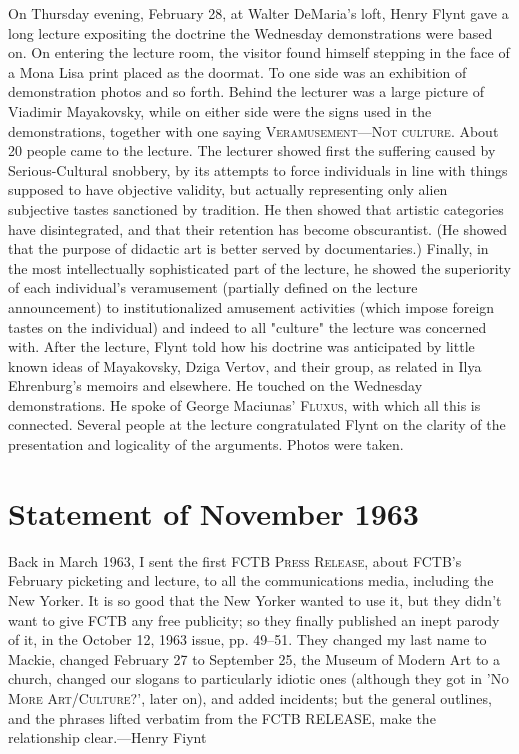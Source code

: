 \documentclass[10pt,twoside]{memoir}
\begin{document}
\begin{enumerate}
{\begin{enumerate}
On Thursday evening, February 28, at Walter DeMaria's loft, Henry Flynt 
gave a long lecture expositing the doctrine the Wednesday demonstrations 
were based on. On entering the lecture room, the visitor found himself 
stepping in the face of a Mona Lisa print placed as the doormat. To one side 
was an exhibition of demonstration photos and so forth. Behind the lecturer 
was a large picture of Viadimir Mayakovsky, while on either side were the 
signs used in the demonstrations, together with one saying 
\textsc{Veramusement---Not culture}. About 20 people came to the lecture. 
The lecturer showed first the suffering caused by Serious-Cultural snobbery, 
by its attempts to force individuals in line with things supposed to have 
objective validity, but actually representing only alien subjective tastes 
sanctioned by tradition. He then showed that artistic categories have 
disintegrated, and that their retention has become obscurantist. (He showed 
that the purpose of didactic art is better served by documentaries.) Finally, 
in the most intellectually sophisticated part of the lecture, he showed the 
superiority of each individual's veramusement (partially defined on the 
lecture announcement) to institutionalized amusement activities (which 
impose foreign tastes on the individual) and indeed to all "culture" the 
lecture was concerned with. After the lecture, Flynt told how his doctrine 
was anticipated by little known ideas of Mayakovsky, Dziga Vertov, and 
their group, as related in Ilya Ehrenburg's memoirs and elsewhere. He 
touched on the Wednesday demonstrations. He spoke of George Maciunas' 
\textsc{Fluxus}, with which all this is connected. Several people at the lecture 
congratulated Flynt on the clarity of the presentation and logicality of the 
arguments. Photos were taken. 

\section{Statement of November 1963}


Back in March 1963, I sent the first \textsc{FCTB Press Release}, about FCTB's 
February picketing and lecture, to all the communications media, including 
the New Yorker. It is so good that the New Yorker wanted to use it, but 
they didn't want to give FCTB any free publicity; so they finally published 
an inept parody of it, in the October 12, 1963 issue, pp. 49--51. They 
changed my last name to Mackie, changed February 27 to September 25, the 
Museum of Modern Art to a church, changed our slogans to particularly 
idiotic ones (although they got in '\textsc{No More Art/Culture?}', later on), 
and added incidents; but the general outlines, and the phrases lifted verbatim 
from the FCTB RELEASE, make the relationship clear.---Henry Fiynt 


\end{enumerate}}
\end{enumerate}
\end{document}
